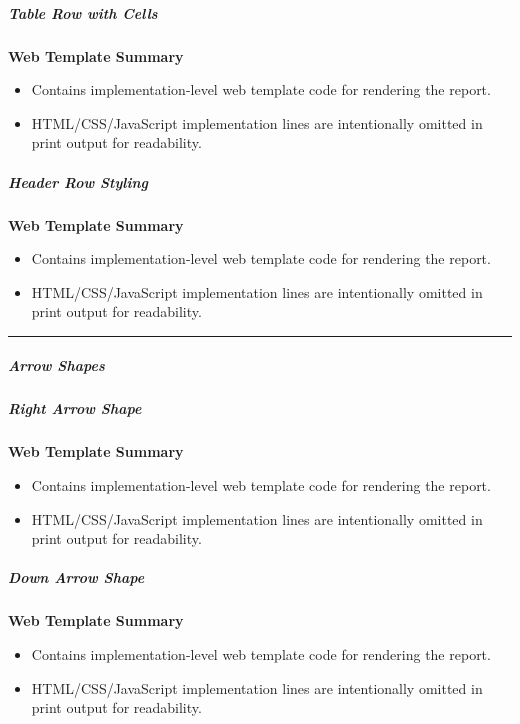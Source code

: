 \documentclass[11pt]{article}
\begin{document}
\subparagraph{Table Row with Cells}\mbox{}\par

\textbf{Web Template Summary}
\begin{itemize}[leftmargin=*,itemsep=2pt,topsep=2pt]
\item {} Contains implementation-level web template code for rendering the report.
\item {} HTML/CSS/JavaScript implementation lines are intentionally omitted in print output for readability.
\end{itemize}

\subparagraph{Header Row Styling}\mbox{}\par

\textbf{Web Template Summary}
\begin{itemize}[leftmargin=*,itemsep=2pt,topsep=2pt]
\item {} Contains implementation-level web template code for rendering the report.
\item {} HTML/CSS/JavaScript implementation lines are intentionally omitted in print output for readability.
\end{itemize}

\vspace{0.5em}\hrule\vspace{0.5em}

\subparagraph{Arrow Shapes}\mbox{}\par

\subparagraph{Right Arrow Shape}\mbox{}\par

\textbf{Web Template Summary}
\begin{itemize}[leftmargin=*,itemsep=2pt,topsep=2pt]
\item {} Contains implementation-level web template code for rendering the report.
\item {} HTML/CSS/JavaScript implementation lines are intentionally omitted in print output for readability.
\end{itemize}

\subparagraph{Down Arrow Shape}\mbox{}\par

\textbf{Web Template Summary}
\begin{itemize}[leftmargin=*,itemsep=2pt,topsep=2pt]
\item {} Contains implementation-level web template code for rendering the report.
\item {} HTML/CSS/JavaScript implementation lines are intentionally omitted in print output for readability.
\end{itemize}
\end{document}
